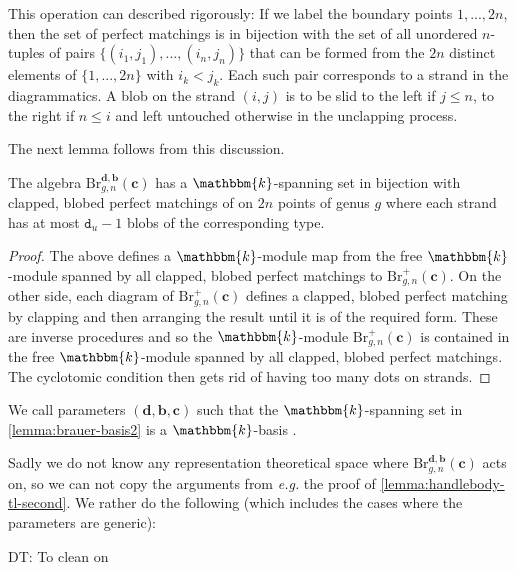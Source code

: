 \documentclass[a4paper,11pt]{amsart}
\let\emph\relax
\newcommand{\eg}{\textsl{e.g.}}
\renewcommand{\dots}{\text{...}}
\newcommand{\setstuff}[1]{\mathrm{#1}}
\newcommand{\KK}{\mathbbm{k}}
\newcommand{\bsym}[1]{\boldsymbol{#1}}
\newcommand{\varsym}[1]{\mathtt{#1}}
\newcommand{\cpar}{\bsym{c}}
\newcommand{\bpar}{\bsym{b}}
\newcommand{\dpar}{\bsym{d}}
\newcommand{\dvar}{\varsym{d}}
\def\DT#1{\textcolor[rgb]{1.00,0.00,1.00}{DT: #1}}
\numberwithin{equation}{section}
\let\fullref\autoref
\begin{document}
This operation can described rigorously: 
If we label the boundary 
points $1,\dots,2n$, then  
the set of perfect matchings is in 
bijection with the set of all 
unordered $n$-tuples of pairs 
$\{(i_{1},j_{1}),\dots,(i_{n},j_{n})\}$ that can be formed from the $2n$ 
distinct elements of $\{1,\dots,2n\}$ with $i_{k}<j_{k}$. Each such pair corresponds to a strand in the diagrammatics. 
A blob on the strand $(i,j)$ is to be slid to the 
left if $j\leq n$, to the right if $n\leq i$ 
and left untouched otherwise in the unclapping process.

The next lemma follows from this discussion.

\begin{lemma}\label{lemma:brauer-basis2}
The algebra 
$\setstuff{Br}_{g,n}^{\dpar,\bpar}(\cpar)$ 
has a $\KK$-spanning set in bijection with clapped, blobed 
perfect matchings of 
on $2n$ points of genus  
$g$ where each strand has at 
most $\dvar_{u}-1$ blobs of the corresponding type.
\end{lemma}

\begin{proof}
The above defines a $\KK$-module map from 
the free $\KK$-module spanned by all 
clapped, blobed perfect matchings to 
$\setstuff{Br}^{+}_{g,n}(\cpar)$.	
On the other side, each diagram of 
$\setstuff{Br}^{+}_{g,n}(\cpar)$ defines a 
clapped, blobed perfect 
matching by clapping and then arranging the result until it is of the required form.
These are inverse 
procedures and so the $\KK$-module 
$\setstuff{Br}^{+}_{g,n}(\cpar)$ 
is contained in the free 
$\KK$-module spanned by all 
clapped, blobed perfect matchings.
The cyclotomic condition then gets rid of 
having too many dots on strands.
\end{proof}

\begin{definition}\label{def:bmw-admissible}
We call parameters $(\dpar,\bpar,\cpar)$ such that the $\KK$-spanning set 
in \fullref{lemma:brauer-basis2} is a $\KK$-basis \emph{admissible}.
\end{definition}

Sadly we do not know any representation theoretical space 
where $\setstuff{Br}_{g,n}^{\dpar,\bpar}(\cpar)$ acts on, 
so we can not copy the arguments from {\eg} the proof of \fullref{lemma:handlebody-tl-second}. We rather do the following 
(which includes the cases where the parameters are generic):

\DT{To clean on}
\end{document}
